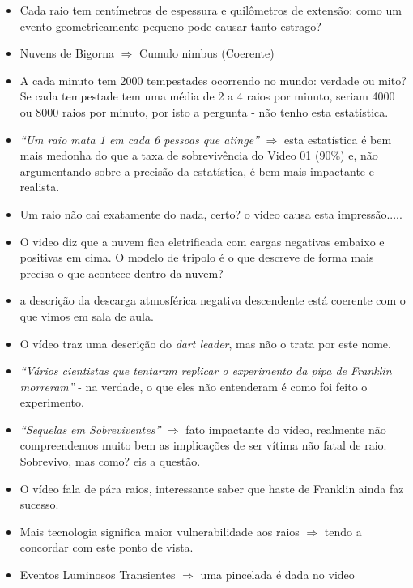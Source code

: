 \documentclass[a4paper, 12pt, onecolumn,singlespacing]{article}
\begin{document}
	\begin{itemize}
		\item Cada raio tem centímetros de espessura e quilômetros de extensão: como um evento geometricamente pequeno pode causar tanto estrago?
		\item Nuvens de Bigorna $\Rightarrow$ Cumulo nimbus (Coerente)
		\item A cada minuto tem 2000 tempestades ocorrendo no mundo: verdade ou mito? Se cada tempestade tem uma média de 2 a 4 raios por minuto, seriam 4000 ou 8000 raios por minuto, por isto a pergunta - não tenho esta estatística.
		\item \textit{``Um raio mata 1 em cada 6 pessoas que atinge''} $\Rightarrow$ esta estatística é bem mais medonha do que a taxa de sobrevivência do Video 01 (90\%) e, não argumentando sobre a precisão da estatística, é bem mais impactante e realista.
		\item Um raio não cai exatamente do nada, certo? o video causa esta impressão.....
		\item O video diz que a nuvem fica eletrificada com cargas negativas embaixo e positivas em cima. O modelo de tripolo é o que descreve de forma mais precisa o que acontece dentro da nuvem?
		\item a descrição da descarga atmosférica negativa descendente está coerente com o que vimos em sala de aula.
		\item O vídeo traz uma descrição do \textit{dart leader}, mas não o trata por este nome.
		\item \textit{``Vários cientistas que tentaram replicar o experimento da pipa de Franklin morreram''} - na verdade, o que eles não entenderam é como foi feito o experimento.
		\item \textit{``Sequelas em Sobreviventes''} $\Rightarrow$ fato impactante do vídeo, realmente não compreendemos muito bem as implicações de ser vítima não fatal de raio. Sobrevivo, mas como? eis a questão.
		\item O vídeo fala de pára raios, interessante saber que haste de Franklin ainda faz sucesso.
		\item Mais tecnologia significa maior vulnerabilidade aos raios $\Rightarrow$ tendo a concordar com este ponto de vista.
		\item Eventos Luminosos Transientes $\Rightarrow$ uma pincelada é dada no video
	\end{itemize}
	
\end{document}
